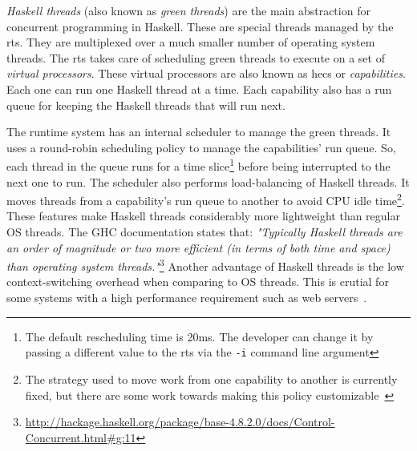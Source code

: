 \emph{Haskell threads} (also known as \emph{green threads}) are the main abstraction for concurrent programming in Haskell. These are special threads managed by the \acl{rts}. They are multiplexed over a much smaller number of operating system threads. The \ac{rts} takes care of scheduling green threads to execute on a set of \emph{virtual processors}. These virtual processors are also known as \acp{hec} or \emph{capabilities}. Each one can run one Haskell thread at a time. Each capability also has a run queue for keeping the Haskell threads that will run next.

The runtime system has an internal scheduler to manage the green threads. It uses a round-robin scheduling policy to manage the capabilities' run queue. So, each thread in the queue runs for a time slice\footnote{The default rescheduling time is 20ms. The developer can change it by passing a different value to the \ac{rts} via the \texttt{-i} command line argument} before being interrupted to the next one to run. The scheduler also performs load-balancing of Haskell threads. It moves threads from a capability's run queue to another to avoid CPU idle time\footnote{The strategy used to move work from one capability to another is currently fixed, but there are some work towards making this policy customizable~\citep{siva:2014}}. These features make Haskell threads considerably more lightweight than regular OS threads. The GHC documentation states that: \emph{"Typically Haskell threads are an order of magnitude or two more efficient (in terms of both time and space) than operating system threads."}\footnote{\url{http://hackage.haskell.org/package/base-4.8.2.0/docs/Control-Concurrent.html\#g:11}} Another advantage of Haskell threads is the low context-switching overhead when comparing to OS threads. This is crutial for some systems with a high performance requirement such as web servers~\citep{voellmy:2013}.

